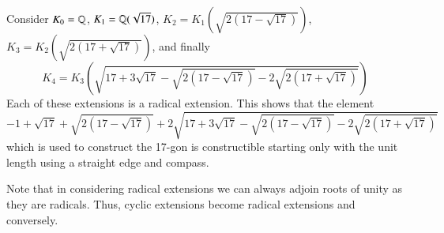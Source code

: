 \documentclass[12pt, a4paper, oneside, openright, titlepage]{book}
\begin{document}
\begin{eg}
    Consider $K_0 = \mathbb Q$, $K_1 = \mathbb Q(\sqrt{17})$, $K_2 = K_1(\sqrt{2(17-\sqrt{17})})$, $K_3 = K_2(\sqrt{2(17+\sqrt{17})})$, and finally \begin{equation*}
        K_4 = K_3\left(\sqrt{17+3\sqrt{17}-\sqrt{2(17-\sqrt{17})}-2\sqrt{2(17+\sqrt{17})}}\right)
    \end{equation*}
    Each of these extensions is a radical extension. This shows that the element \begin{equation*}
        -1+\sqrt{17}+\sqrt{2(17-\sqrt{17})} +2\sqrt{17+3\sqrt{17}-\sqrt{2(17-\sqrt{17})}-2\sqrt{2(17+\sqrt{17})}}
    \end{equation*}
    which is used to construct the 17-gon is constructible starting only with the unit length using a straight edge and compass.
\end{eg}

Note that in considering radical extensions we can always adjoin roots of unity as they are radicals. Thus, cyclic extensions become radical extensions and conversely.
\end{document}
